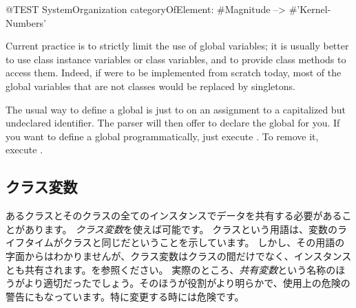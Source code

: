 \documentclass[a4paper,10pt,twoside]{book}
\begin{document}
\begin{code}{@TEST}
SystemOrganization categoryOfElement: #Magnitude --> #'Kernel-Numbers'
\end{code}

Current practice is to strictly limit the use of global variables; it is usually better to use class instance variables or class variables, and to provide class methods to access them.  Indeed, if \pharo were to be implemented from scratch today, most of the global variables that are not classes would be replaced by singletons.

The usual way to define a global is just to  on an assignment to a capitalized but undeclared identifier.  The parser will then offer to declare the global for you.  If you want to define a global programmatically, just execute .  To remove it, execute .

\subsection{クラス変数}

あるクラスとそのクラスの全てのインスタンスでデータを共有する必要があることがあります。
\emph{クラス変数}を使えば可能です。
クラスという用語は、変数のライフタイムがクラスと同じだということを示しています。
しかし、その用語の字面からはわかりませんが、クラス変数はクラスの間だけでなく、インスタンスとも共有されます。を参照ください。
実際のところ、\emph{共有変数}という名称のほうがより適切だったでしょう。そのほうが役割がより明らかで、使用上の危険の警告にもなっています。特に変更する時には危険です。
\end{document}

